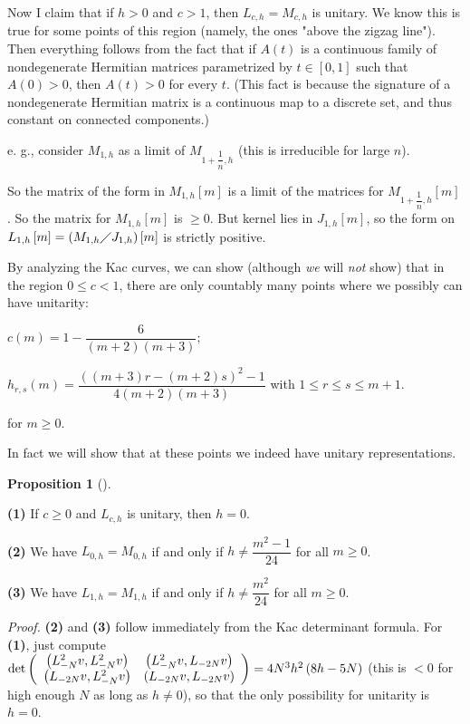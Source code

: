 \documentclass
[numbers=enddot,12pt,final,onecolumn,german,notitlepage]{scrartcl}%
\theoremstyle{definition}
\newtheorem{prop}[theo]{Proposition}
\newenvironment{proposition}[1][]
{\begin{prop}[#1]\begin{leftbar}}
{\end{leftbar}\end{prop}}
\begin{document}
Now I claim that if $h>0$ and $c>1$, then $L_{c,h}=M_{c,h}$ is unitary. We
know this is true for some points of this region (namely, the ones "above the
zigzag line"). Then everything follows from the fact that if $A\left(
t\right)  $ is a continuous family of nondegenerate Hermitian matrices
parametrized by $t\in\left[  0,1\right]  $ such that $A\left(  0\right)  >0$,
then $A\left(  t\right)  >0$ for every $t$. (This fact is because the
signature of a nondegenerate Hermitian matrix is a continuous map to a
discrete set, and thus constant on connected components.)

e. g., consider $M_{1,h}$ as a limit of $M_{1+\dfrac{1}{n},h}$ (this is
irreducible for large $n$).

So the matrix of the form in $M_{1,h}\left[  m\right]  $ is a limit of the
matrices for $M_{1+\dfrac{1}{n},h}\left[  m\right]  $. So the matrix for
$M_{1,h}\left[  m\right]  $ is $\geq0$. But kernel lies in $J_{1,h}\left[
m\right]  $, so the form on $L_{1,h}\left[  m\right]  =\left(  M_{1,h}\diagup
J_{1,h}\right)  \left[  m\right]  $ is strictly positive.

By analyzing the Kac curves, we can show (although \textit{we} will
\textit{not} show) that in the region $0\leq c<1$, there are only countably
many points where we possibly can have unitarity:

$c\left(  m\right)  =1-\dfrac{6}{\left(  m+2\right)  \left(  m+3\right)  };$

$h_{r,s}\left(  m\right)  =\dfrac{\left(  \left(  m+3\right)  r-\left(
m+2\right)  s\right)  ^{2}-1}{4\left(  m+2\right)  \left(  m+3\right)  }$ with
$1\leq r\leq s\leq m+1$.

for $m\geq0$.

In fact we will show that at these points we indeed have unitary representations.

\begin{proposition}
\textbf{(1)} If $c\geq0$ and $L_{c,h}$ is unitary, then $h=0$.

\textbf{(2)} We have $L_{0,h}=M_{0,h}$ if and only if $h\neq\dfrac{m^{2}%
-1}{24}$ for all $m\geq0$.

\textbf{(3)} We have $L_{1,h}=M_{1,h}$ if and only if $h\neq\dfrac{m^{2}}{24}$
for all $m\geq0$.
\end{proposition}

\textit{Proof.} \textbf{(2)} and \textbf{(3)} follow immediately from the Kac
determinant formula. For \textbf{(1)}, just compute $\det\left(
\begin{array}
[c]{cc}%
\left(  L_{-N}^{2}v,L_{-N}^{2}v\right)  & \left(  L_{-N}^{2}v,L_{-2N}v\right)
\\
\left(  L_{-2N}v,L_{-N}^{2}v\right)  & \left(  L_{-2N}v,L_{-2N}v\right)
\end{array}
\right)  =4N^{3}h^{2}\left(  8h-5N\right)  $ (this is $<0$ for high enough $N$
as long as $h\neq0$), so that the only possibility for unitarity is $h=0$.
\end{document}
